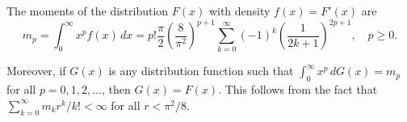 The moments of the distribution $F(x)$ with density $f(x) = F'(x)$ are
$$m_p = \int_0^\infty x^p f(x) \, dx = p! \frac{\pi}{2} \left( \frac{8}{\pi^2} \right)^{p+1} \sum_{k=0}^{\infty} (-1)^k \left( \frac{1}{2k+1} \right)^{2p+1}, \quad p \geq 0.$$

Moreover, if $G(x)$ is any distribution function such that $\int_0^\infty x^p \, dG(x) = m_p$ for all $p = 0, 1, 2, \ldots$, then $G(x) = F(x)$. This follows from the fact that $\sum_{k=0}^{\infty} m_k r^k / k! < \infty$ for all $r < \pi^2/8$.

